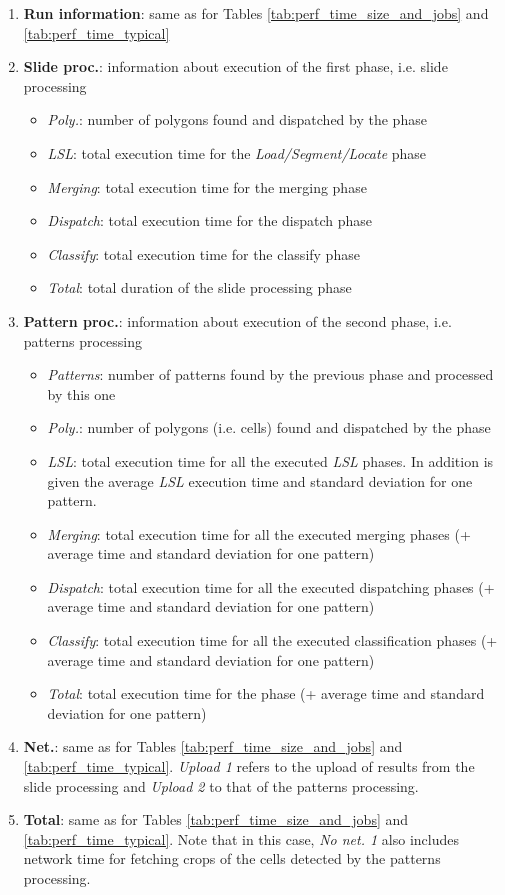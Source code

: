 \begin{enumerate}
	\item \textbf{Run information}: same as for Tables \ref{tab:perf_time_size_and_jobs} and \ref{tab:perf_time_typical}
	\item \textbf{Slide proc.}: information about execution of the first phase, i.e. slide processing
	\begin{itemize}
		\item \textit{Poly.}: number of polygons found and dispatched by the phase
		\item \textit{LSL}: total execution time for the \textit{Load/Segment/Locate} phase
		\item \textit{Merging}: total execution time for the merging phase
		\item \textit{Dispatch}: total execution time for the dispatch phase
		\item \textit{Classify}: total execution time for the classify phase
		\item \textit{Total}: total duration of the slide processing phase 
	\end{itemize}
	\item \textbf{Pattern proc.}: information about execution of the second phase, i.e. patterns processing
	\begin{itemize}
		\item \textit{Patterns}: number of patterns found by the previous phase and processed by this one
		\item \textit{Poly.}: number of polygons (i.e. cells) found and dispatched by the phase
		\item \textit{LSL}: total execution time for all the executed \textit{LSL} phases. In addition is given the average \textit{LSL} execution time and standard deviation for one pattern. 
		\item \textit{Merging}: total execution time for all the executed merging phases (+ average time and standard deviation for one pattern)
		\item \textit{Dispatch}: total execution time for all the executed dispatching phases (+ average time and standard deviation for one pattern)
		\item \textit{Classify}: total execution time  for all the executed classification phases (+ average time and standard deviation for one pattern)
		\item \textit{Total}: total execution time for the phase (+ average time and standard deviation for one pattern)
	\end{itemize}	 
	\item \textbf{Net.}: same as for Tables \ref{tab:perf_time_size_and_jobs} and \ref{tab:perf_time_typical}. \textit{Upload 1} refers to the upload of results from the slide processing and \textit{Upload 2} to that of the patterns processing.
	\item \textbf{Total}: same as for Tables \ref{tab:perf_time_size_and_jobs} and \ref{tab:perf_time_typical}. Note that in this case, \textit{No net. 1} also includes network time for fetching crops of the cells detected by the patterns processing.
\end{enumerate}

